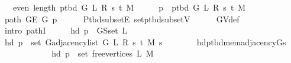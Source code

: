 \begin{isabellebody}
\ \ \ {\isachardoublequoteopen}even\ {\isacharparenleft}{\kern0pt}length\ {\isacharparenleft}{\kern0pt}p{\isacharunderscore}{\kern0pt}tbd\ G\ L\ R\ s\ t\ M{\isacharparenright}{\kern0pt}{\isacharparenright}{\kern0pt}{\isachardoublequoteclose}%
\endisataginvisible
{\isafoldinvisible}%
%
\isadeliminvisible
\isanewline
%
\endisadeliminvisible
%
\isadelimproof
%
\endisadelimproof
%
\isatagproof
{}\isamarkupfalse%
\ {\isacharminus}{\kern0pt}\isanewline
\ \ \isamarkupfalse%
\ {\isacharquery}{\kern0pt}p\ {\isacharequal}{\kern0pt}\ {\isachardoublequoteopen}p{\isacharunderscore}{\kern0pt}tbd\ G\ L\ R\ s\ t\ M{\isachardoublequoteclose}\isanewline
\ \ \isamarkupfalse%
\ {\isachardoublequoteopen}path\ {\isacharparenleft}{\kern0pt}G{\isachardot}{\kern0pt}E\ G{\isacharparenright}{\kern0pt}\ {\isacharquery}{\kern0pt}p{\isachardoublequoteclose}\isanewline
\ \ \ \ \isamarkupfalse%
\ P{\isacharunderscore}{\kern0pt}tbd{\isacharunderscore}{\kern0pt}subset{\isacharunderscore}{\kern0pt}E\ set{\isacharunderscore}{\kern0pt}p{\isacharunderscore}{\kern0pt}tbd{\isacharunderscore}{\kern0pt}subset{\isacharunderscore}{\kern0pt}V\isanewline
\ \ \ \ \isamarkupfalse%
\ G{\isachardot}{\kern0pt}V{\isacharunderscore}{\kern0pt}def\isanewline
\ \ \ \ \isamarkupfalse%
\ {\isacharparenleft}{\kern0pt}intro\ pathI{\isacharparenright}{\kern0pt}\isanewline
\ \ \isamarkupfalse%
\ \isamarkupfalse%
\ {\isachardoublequoteopen}hd\ {\isacharquery}{\kern0pt}p\ {\isasymin}\ G{\isachardot}{\kern0pt}S{\isachardot}{\kern0pt}set\ L{\isachardoublequoteclose}\isanewline
\ \ \isamarkupfalse%
\ {\isacharminus}{\kern0pt}\isanewline
\ \ \ \ \isamarkupfalse%
\ {\isachardoublequoteopen}hd\ {\isacharquery}{\kern0pt}p\ {\isasymin}\ set\ {\isacharparenleft}{\kern0pt}G{\isachardot}{\kern0pt}adjacency{\isacharunderscore}{\kern0pt}list\ {\isacharparenleft}{\kern0pt}G{}\ L\ R\ s\ t\ M{\isacharparenright}{\kern0pt}\ s{\isacharparenright}{\kern0pt}{\isachardoublequoteclose}\isanewline
\ \ \ \ \ \ \isamarkupfalse%
\ hd{\isacharunderscore}{\kern0pt}p{\isacharunderscore}{\kern0pt}tbd{\isacharunderscore}{\kern0pt}mem{\isacharunderscore}{\kern0pt}adjacency{\isacharunderscore}{\kern0pt}G{}{\isacharunderscore}{\kern0pt}s\isanewline
\ \ \ \ \ \ \isacommand{{\isachardot}{\kern0pt}}\isamarkupfalse%
\isanewline
\ \ \ \ \isamarkupfalse%
\ {\isachardoublequoteopen}hd\ {\isacharquery}{\kern0pt}p\ {\isasymin}\ set\ {\isacharparenleft}{\kern0pt}free{\isacharunderscore}{\kern0pt}vertices\ L\ M{\isacharparenright}{\kern0pt}{\isachardoublequoteclose}\isanewline

\end{isabellebody}
